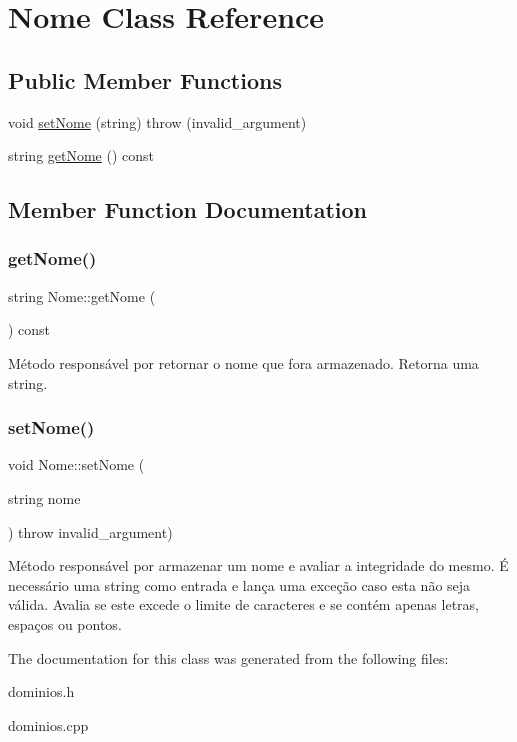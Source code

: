 \hypertarget{classNome}{}\section{Nome Class Reference}
\label{classNome}
\subsection*{Public Member Functions}
\begin{DoxyCompactItemize}
\item 
void \hyperlink{classNome_ab1507b81047efb89b50b6be0d33c08e5}{set\+Nome} (string)  throw (invalid\+\_\+argument)
\item 
string \hyperlink{classNome_a1c08f5b9827a1e97a2631196ff99fdef}{get\+Nome} () const
\end{DoxyCompactItemize}


\subsection{Member Function Documentation}
\mbox{\label{classNome_a1c08f5b9827a1e97a2631196ff99fdef}} 
\subsubsection{\texorpdfstring{get\+Nome()}{getNome()}}
{\footnotesize\ttfamily string Nome\+::get\+Nome (\begin{DoxyParamCaption}{ }\end{DoxyParamCaption}) const\hspace{0.3cm}{\ttfamily [inline]}}

Método responsável por retornar o nome que fora armazenado. Retorna uma string. \mbox{\label{classNome_ab1507b81047efb89b50b6be0d33c08e5}} 
\subsubsection{\texorpdfstring{set\+Nome()}{setNome()}}
{\footnotesize\ttfamily void Nome\+::set\+Nome (\begin{DoxyParamCaption}\item[{string}]{nome }\end{DoxyParamCaption}) throw  invalid\+\_\+argument) }

Método responsável por armazenar um nome e avaliar a integridade do mesmo. É necessário uma string como entrada e lança uma exceção caso esta não seja válida. Avalia se este excede o limite de caracteres e se contém apenas letras, espaços ou pontos. 

The documentation for this class was generated from the following files\+:\begin{DoxyCompactItemize}
\item 
dominios.\+h\item 
dominios.\+cpp\end{DoxyCompactItemize}
